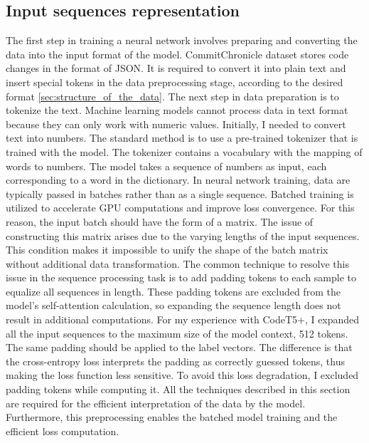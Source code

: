 \subsection{Input sequences representation}
The first step in training a neural network involves preparing and converting the data into the input format of the model. CommitChronicle dataset stores code changes in the format of JSON. It is required to convert it into plain text and insert special tokens in the data preprocessing stage, according to the desired format \ref{sec:structure_of_the_data}. 
The next step in data preparation is to tokenize the text. Machine learning models cannot process data in text format because they can only work with numeric values.
Initially, I needed to convert text into numbers. The standard method is to use a pre-trained tokenizer that is trained with the model. The tokenizer contains a vocabulary with the mapping of words to numbers. The model takes a sequence of numbers as input, each corresponding to a word in the dictionary.
In neural network training, data are typically passed in batches rather than as a single sequence. Batched training is utilized to accelerate GPU computations and improve loss convergence. For this reason, the input batch should have the form of a matrix. The issue of constructing this matrix arises due to the varying lengths of the input sequences. This condition makes it impossible to unify the shape of the batch matrix without additional data transformation. The common technique to resolve this issue in the sequence processing task is to add padding tokens to each sample to equalize all sequences in length. These padding tokens are excluded from the model's self-attention calculation, so expanding the sequence length does not result in additional computations. For my experience with CodeT5+, I expanded all the input sequences to the maximum size of the model context, 512 tokens. The same padding should be applied to the label vectors. The difference is that the cross-entropy loss interprets the padding as correctly guessed tokens, thus making the loss function less sensitive. To avoid this loss degradation, I excluded padding tokens while computing it.
All the techniques described in this section are required for the efficient interpretation of the data by the model. Furthermore, this preprocessing enables the batched model training and the efficient loss computation.

